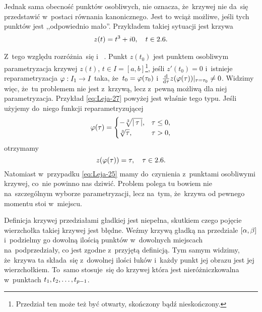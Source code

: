 \documentclass[a4paper,11pt]{article}
\begin{document}
Jednak sama obecność punktów osobliwych, nie oznacza, że~krzywej nie
da~się przedstawić w~postaci równania kanonicznego. Jest to wciąż
możliwe, jeśli tych punktów jest ,,odpowiednio mało''. Przykładem
takiej sytuacji jest krzywa
\begin{equation}
  \label{eq:Leja-30}
  \begin{split}
    z( t ) = t^{ 3 } + i 0, \quad t \in 2.6.
  \end{split}
\end{equation}

Z~tego względu rozróżnia~się  i~
\cite{GdowskiElementGeometriiRozniczkowejZZadaniami1999}. Punkt
$z( t_{ 0 } )$ jest punktem osobliwym parametryzacja krzywej $z( t )$,
$t \in I = [ a, b ]$\footnote{Przedział ten może też być otwarty,
  skończony bądź nieskończony.}, jeśli $z'( t_{ 0 } ) = 0$ i~istnieje
reparametryzacja $\varphi: I_{ 1 } \to I$ taka,
że~$t_{ 0 } = \varphi( \tau_{ 0 } )$
i~$\tfrac{ \mathrm{d} }{ \mathrm{d} \tau } z( \varphi( \tau ) )|_{ \tau = \tau_{ 0 } }
\neq 0$. Widzimy więc, że~tu problemem nie jest z~krzywą, lecz z~pewną
możliwą dla niej parametryzacja. Przykład \eqref{eq:Leja-27} powyżej
jest właśnie tego typu. Jeśli użyjemy do~niego funkcji
reparametryzującej
\begin{equation}
  \label{eq:Leja-31}
  \varphi( \tau ) =
  \begin{cases}
    -\sqrt[3]{ \left| \,  \tau  \, \right| }, & \tau \leq 0, \\
    \sqrt[3]{ \tau }, & \tau > 0,
  \end{cases}
\end{equation}
otrzymamy
\begin{equation}
  \label{eq:Leja-32}
  z( \varphi( \tau ) ) = \tau, \quad \tau \in 2.6.
\end{equation}
Natomiast w~przypadku \eqref{eq:Leja-25} mamy do~czynienia z~punktami
osobliwymi krzywej, co~nie powinno nas dziwić. Problem polega tu
bowiem nie na~szczególnym wyborze parametryzacji, lecz na~tym,
że~krzywa od pewnego momentu stoi w~miejscu.

\vspace{\spaceFour}


\start {} Definicja krzywej przedziałami gładkiej jest
niepełna, skutkiem czego pojęcie wierzchołka takiej krzywej jest
błędne. Weźmy krzywą gładką na przedziale $[ \alpha, \beta ]$ i~podzielmy
go dowolną ilością punktów w~dowolnych miejscach na~podprzedziały, co
jest zgodne z~przyjętą definicją. Tym samym widzimy, że~krzywa ta
składa~się z~dowolnej ilości łuków i~każdy punkt jej obrazu jest jej
wierzchołkiem. To~samo stosuje~się do krzywej która jest
nieróżniczkowalna w~punktach $t_{ 1 }, t_{ 2 }, \ldots, t_{ p - 1 }$.
\end{document}
